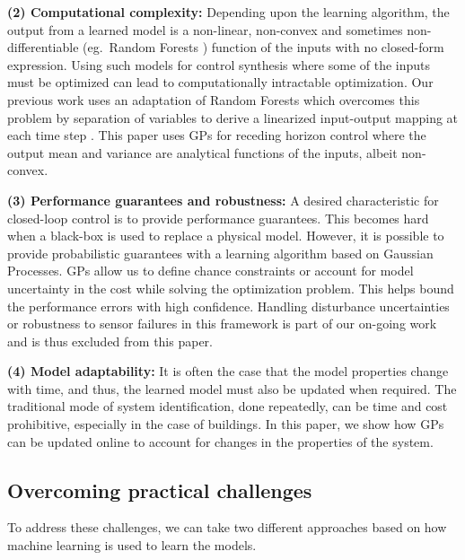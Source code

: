 \noindent \textbf{(2) Computational complexity:} Depending upon the learning algorithm, the output from a learned model is a non-linear, non-convex and sometimes non-differentiable (eg.~Random Forests \cite{Friedman2001}) function of the inputs with no closed-form expression. 
Using such models for control synthesis where some of the inputs must be optimized can lead to computationally intractable optimization. 
Our previous work uses an adaptation of Random Forests which overcomes this problem by separation of variables to derive a linearized input-output mapping at each time step \cite{JainCDC2017}.
This paper uses GPs for receding horizon control where the output mean and variance are analytical functions of the inputs, albeit non-convex.

\noindent \textbf{(3) Performance guarantees and robustness:} A desired characteristic for closed-loop control is to provide performance guarantees. 
This becomes hard when a black-box is used to replace a physical model. 
However, it is possible to provide probabilistic guarantees with a learning algorithm based on Gaussian Processes. 
GPs allow us to define chance constraints or account for model uncertainty in the cost while solving the optimization problem. This helps bound the performance errors with high confidence. 
Handling disturbance uncertainties or robustness to sensor failures in this framework is part of our on-going work and is thus excluded from this paper.

\noindent \textbf{(4) Model adaptability:} It is often the case that the model properties change with time, %
and thus, the learned model must also be updated when required. 
The traditional mode of system identification, done repeatedly, can be time and cost prohibitive, especially in the case of buildings. 
In this paper, we show how GPs can be updated online to account for %
changes in the properties of the system.


\subsection{Overcoming practical challenges}
To address these challenges, we can take two different approaches based on how machine learning is used to learn the models.

